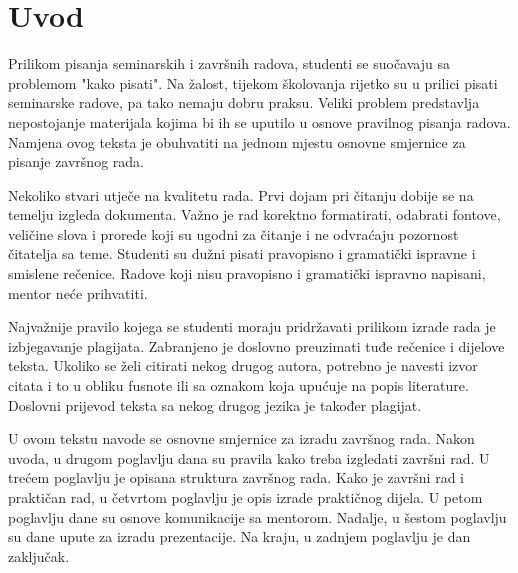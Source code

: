 \section{Uvod}
Prilikom pisanja seminarskih i završnih radova, studenti se suočavaju sa problemom "kako pisati". Na žalost, tijekom školovanja rijetko su u prilici 
pisati seminarske radove, pa tako 
nemaju dobru praksu. Veliki problem predstavlja nepostojanje materijala kojima bi ih se uputilo u osnove pravilnog pisanja radova. Namjena ovog teksta 
je obuhvatiti na jednom 
mjestu osnovne smjernice za pisanje završnog rada.

Nekoliko stvari utječe na kvalitetu rada. Prvi dojam pri čitanju dobije se na temelju izgleda dokumenta. Važno je rad korektno formatirati, odabrati fontove, 
veličine slova i prorede 
koji su ugodni za čitanje i ne odvraćaju pozornost čitatelja sa teme. Studenti su dužni pisati pravopisno i gramatički ispravne i smislene rečenice. 
Radove koji nisu pravopisno i gramatički ispravno napisani, mentor neće prihvatiti.

Najvažnije pravilo kojega se studenti moraju pridržavati prilikom izrade rada je izbjegavanje plagijata. Zabranjeno je doslovno preuzimati tuđe rečenice 
i dijelove teksta. Ukoliko 
se želi citirati nekog drugog autora, potrebno je navesti izvor citata i to u obliku fusnote ili sa oznakom koja upućuje na popis literature\nocite{*}. 
Doslovni prijevod teksta sa nekog drugog 
jezika je također plagijat.

U ovom tekstu navode se osnovne smjernice za izradu završnog rada. Nakon uvoda, u drugom poglavlju dana su pravila kako treba izgledati završni rad. 
U trećem 
poglavlju je opisana struktura završnog rada. Kako je završni rad i praktičan rad, u četvrtom poglavlju je opis izrade praktičnog dijela. U petom poglavlju 
dane su osnove komunikacije sa mentorom. Nadalje, u 
šestom poglavlju su dane upute za izradu prezentacije. Na kraju, u zadnjem poglavlju je dan zaključak.


 
